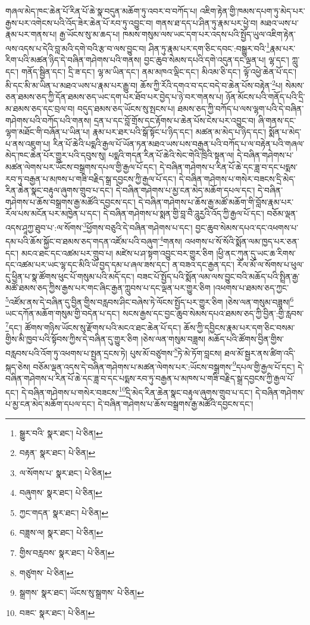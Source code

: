 གཞལ་མེད་ཁང་ཆེན་པོ་རིན་པོ་ཆེ་སྣ་བདུན་མཆོག་ཏུ་འབར་བ་བཀོད་པ། འཇིག་རྟེན་གྱི་ཁམས་དཔག་ཏུ་མེད་པར་རྒྱས་པར་འགེངས་པའི་འོད་ཟེར་ཆེན་པོ་རབ་ཏུ་འབྱུང་བ། གནས་ཐ་དད་པ་ཤིན་ཏུ་རྣམ་པར་ཕྱེ་བ། མཐའ་ཡས་པ་རྣམ་པར་གནས་པ། རྒྱ་ཡོངས་སུ་མ་ཆད་པ། ཁམས་གསུམ་ལས་ཡང་དག་པར་འདས་པའི་སྤྱོད་ཡུལ་འཇིག་རྟེན་ལས་འདས་པ་དེའི་བླ་མའི་དགེ་བའི་རྩ་བ་ལས་བྱུང་བ། ཤིན་ཏུ་རྣམ་པར་དག་ཅིང་དབང་:བསྒྱུར་བའི་\footnote{སྒྱུར་བའི་  སྣར་ཐང་།  པེ་ཅིན། }རྣམ་པར་རིག་པའི་མཚན་ཉིད་དེ་བཞིན་གཤེགས་པའི་གནས། བྱང་ཆུབ་སེམས་དཔའི་དགེ་འདུན་དང་ལྡན་པ། ལྷ་དང་། ཀླུ་དང་། གནོད་སྦྱིན་དང་། དྲི་ཟ་དང་། ལྷ་མ་ཡིན་དང་། ནམ་མཁའ་ལྡིང་དང་། མིའམ་ཅི་དང་། ལྟོ་འཕྱེ་ཆེན་པོ་དང་། མི་དང་མི་མ་ཡིན་པ་མཐའ་ཡས་པ་རྣམ་པར་རྒྱུ་བ། ཆོས་ཀྱི་རོའི་དགའ་བ་དང་བདེ་བ་ཆེན་པོས་བརྟེན་\footnote{བརྟན་  སྣར་ཐང་།  པེ་ཅིན། }པ། སེམས་ཅན་ཐམས་ཅད་ཀྱི་དོན་ཐམས་ཅད་ཡང་དག་པར་ཐོབ་པར་བྱེད་པ་ཉེ་བར་གནས་པ། ཉོན་མོངས་པའི་གནོད་པའི་དྲི་མ་ཐམས་ཅད་དང་བྲལ་བ། བདུད་ཐམས་ཅད་ཡོངས་སུ་སྤངས་པ། ཐམས་ཅད་ཀྱི་བཀོད་པ་ལས་ལྷག་པའི་དེ་བཞིན་གཤེགས་པའི་བཀོད་པའི་གནས། དྲན་པ་དང་བློ་གྲོས་དང་རྟོགས་པ་ཆེན་པོས་ངེས་པར་འབྱུང་བ། ཞི་གནས་དང་ལྷག་མཐོང་གི་བཞོན་པ་ཡིན་པ། རྣམ་པར་ཐར་པའི་སྒོ་སྟོང་པ་ཉིད་དང་། མཚན་མ་མེད་པ་ཉིད་དང་། སྨོན་པ་མེད་པ་ནས་འཇུག་པ། རིན་པོ་ཆེའི་པདྨའི་རྒྱལ་པོ་ཡོན་ཏན་མཐའ་ཡས་པས་བརྒྱན་པའི་བཀོད་པ་ལ་བརྟེན་པའི་གཞལ་མེད་ཁང་ཆེན་པོར་གྱུར་པའི་དབུས་སུ། པདྨའི་གདན་རིན་པོ་ཆེའི་སེང་གེའི་ཁྲིའི་སྟན་ལ། དེ་བཞིན་གཤེགས་པ་མཚན་ལེགས་པར་ཡོངས་བསྒྲགས་དཔལ་གྱི་རྒྱལ་པོ་དང་། དེ་བཞིན་གཤེགས་པ་རིན་པོ་ཆེ་དང་ཟླ་བ་དང་པདྨས་རབ་ཏུ་བརྒྱན་པ་མཁས་པ་གཟི་བརྗིད་སྒྲ་དབྱངས་ཀྱི་རྒྱལ་པོ་དང་། དེ་བཞིན་གཤེགས་པ་གསེར་བཟངས་དྲི་མེད་རིན་ཆེན་སྣང་བརྟུལ་ཞུགས་གྲུབ་པ་དང་། དེ་བཞིན་གཤེགས་པ་མྱ་ངན་མེད་མཆོག་དཔལ་དང་། དེ་བཞིན་གཤེགས་པ་ཆོས་བསྒྲགས་རྒྱ་མཚོའི་དབྱངས་དང་། དེ་བཞིན་གཤེགས་པ་ཆོས་རྒྱ་མཚོ་མཆོག་གི་བློས་རྣམ་པར་རོལ་པས་མངོན་པར་མཁྱེན་པ་དང་། དེ་བཞིན་གཤེགས་པ་སྨན་གྱི་བླ་བཻ་ཌཱུརྱའི་འོད་ཀྱི་རྒྱལ་པོ་དང་། བཅོམ་ལྡན་འདས་ཤཱཀྱ་ཐུབ་པ་:ལ་སོགས་\footnote{ལ་སོགས་པ་  སྣར་ཐང་།  པེ་ཅིན། }ཕྱོགས་བཅུའི་དེ་བཞིན་གཤེགས་པ་དང་། བྱང་ཆུབ་སེམས་དཔའ་དང་འཕགས་པ་དམ་པའི་ཆོས་སྐྱོང་བ་ཐམས་ཅད་གདན་འཛོམ་པའི་བཞུག་\footnote{བཞུགས་  སྣར་ཐང་།  པེ་ཅིན། }གནས། འཕགས་པ་སོ་སོའི་སྨོན་ལམ་ཁྱད་པར་ཅན་དང་། མངའ་ཐང་དང་འཚམ་པར་གྲུབ་པ། མཛེས་པ་ཤ་སྟག་འབྱུང་བར་གྱུར་ཅིག །ཕྱི་ནང་ཀུན་དུ་ཡང་ཆ་རིགས་དང་འཚམ་པར་ཡང་ལྷ་དང་མིའི་ཡོ་བྱད་དམ་པ་ཞལ་ཟས་དང་། ན་བཟའ་དང་རྒྱན་དང་། རོལ་མོ་ལ་སོགས་པ་ཕུལ་དུ་ཕྱིན་པ་སྣ་ཚོགས་ཕུང་པོ་གསུམ་པའི་མདོ་དང་། བཟང་པོ་སྤྱོད་པའི་སྨོན་ལམ་ལས་བྱུང་བའི་མཆོད་པའི་སྤྲིན་རྒྱ་མཚོ་ཐམས་ཅད་ཀྱིས་རྒྱས་པར་གང་ཞིང་རྒྱན་ཀླུབས་པ་དང་ལྡན་པར་གྱུར་ཅིག །འཕགས་པ་ཐམས་ཅད་ཀྱང་\footnote{ཀྱང་གདན་  སྣར་ཐང་།  པེ་ཅིན། }འཛོམ་ནས་དེ་བཞིན་དུ་བྱིན་གྱིས་བརླབས་ཤིང་བཞེས་ཏེ་ལོངས་སྤྱོད་པར་གྱུར་ཅིག །ཅེས་ལན་གསུམ་བཟླས།\footnote{བཟླས་ལ།  སྣར་ཐང་།  པེ་ཅིན། } ཡང་དཀོན་མཆོག་གསུམ་གྱི་བདེན་པ་དང་། སངས་རྒྱས་དང་བྱང་ཆུབ་སེམས་དཔའ་ཐམས་ཅད་ཀྱི་བྱིན་:གྱི་རླབས་\footnote{གྱིས་བརླབས་  སྣར་ཐང་།  པེ་ཅིན། }དང་། ཚོགས་གཉིས་ཡོངས་སུ་རྫོགས་པའི་མངའ་ཐང་ཆེན་པོ་དང་། ཆོས་ཀྱི་དབྱིངས་རྣམ་པར་དག་ཅིང་བསམ་གྱིས་མི་ཁྱབ་པའི་སྟོབས་ཀྱིས་དེ་བཞིན་དུ་གྱུར་ཅིག །ཅེས་ལན་གསུམ་བཟླས། མཆོད་པའི་ཚོགས་བྱིན་གྱིས་བརླབས་པའི་འོག་ཏུ་འཕགས་པ་སྤྱན་དྲངས་ཏེ། པུས་མོ་བཙུགས་\footnote{གཙུགས་  པེ་ཅིན། }ཏེ་མེ་ཏོག་བླངས། ཐལ་མོ་སྦྱར་ནས་ཚིག་འདི་སྐད་ཅེས། བཅོམ་ལྡན་འདས་དེ་བཞིན་གཤེགས་པ་མཚན་ལེགས་པར་:ཡོངས་བསྒྲགས་\footnote{སྒྲགས་  སྣར་ཐང་། ཡོངས་སུ་སྒྲགས་  པེ་ཅིན། }དཔལ་གྱི་རྒྱལ་པོ་དང་། དེ་བཞིན་གཤེགས་པ་རིན་པོ་ཆེ་དང་ཟླ་བ་དང་པདྨས་རབ་ཏུ་བརྒྱན་པ་མཁས་པ་གཟི་བརྗིད་སྒྲ་དབྱངས་ཀྱི་རྒྱལ་པོ་དང་། དེ་བཞིན་གཤེགས་པ་གསེར་བཟངས་\footnote{བཟང་  སྣར་ཐང་།  པེ་ཅིན། }དྲི་མེད་རིན་ཆེན་སྣང་བརྟུལ་ཞུགས་གྲུབ་པ་དང་། དེ་བཞིན་གཤེགས་པ་མྱ་ངན་མེད་མཆོག་དཔལ་དང་། དེ་བཞིན་གཤེགས་པ་ཆོས་བསྒྲགས་རྒྱ་མཚོའི་དབྱངས་དང་། 